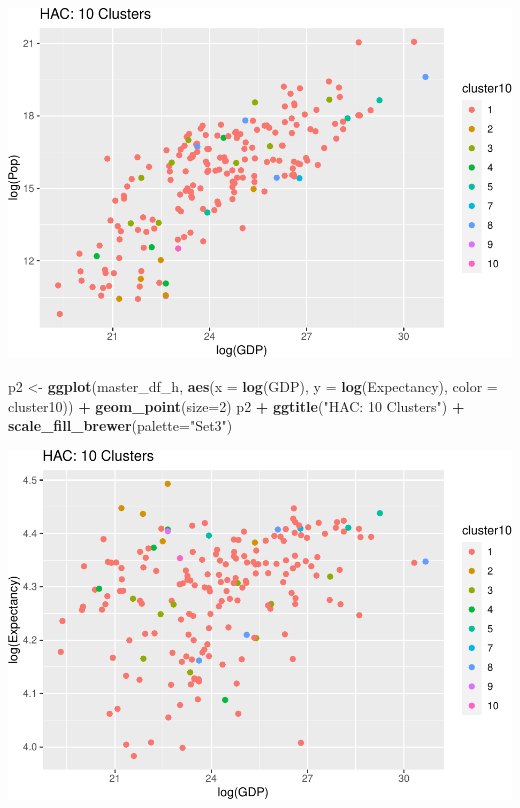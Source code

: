 \documentclass[]{article}
\newenvironment{Shaded}{\begin{snugshade}}{\end{snugshade}}
\newcommand{\DataTypeTok}[1]{\textcolor[rgb]{0.13,0.29,0.53}{#1}}
\newcommand{\DecValTok}[1]{\textcolor[rgb]{0.00,0.00,0.81}{#1}}
\newcommand{\KeywordTok}[1]{\textcolor[rgb]{0.13,0.29,0.53}{\textbf{#1}}}
\newcommand{\NormalTok}[1]{#1}
\newcommand{\OperatorTok}[1]{\textcolor[rgb]{0.81,0.36,0.00}{\textbf{#1}}}
\newcommand{\StringTok}[1]{\textcolor[rgb]{0.31,0.60,0.02}{#1}}
\begin{document}
\includegraphics{eda_files/figure-latex/unnamed-chunk-30-1.pdf}

\begin{Shaded}
\begin{Highlighting}[]
\NormalTok{p2 <-}\StringTok{ }\KeywordTok{ggplot}\NormalTok{(master_df_h, }\KeywordTok{aes}\NormalTok{(}\DataTypeTok{x =} \KeywordTok{log}\NormalTok{(GDP), }\DataTypeTok{y =} \KeywordTok{log}\NormalTok{(Expectancy), }\DataTypeTok{color =}\NormalTok{ cluster10)) }\OperatorTok{+}
\StringTok{  }\KeywordTok{geom_point}\NormalTok{(}\DataTypeTok{size=}\DecValTok{2}\NormalTok{)}
\NormalTok{p2 }\OperatorTok{+}\StringTok{ }\KeywordTok{ggtitle}\NormalTok{(}\StringTok{"HAC: 10 Clusters"}\NormalTok{) }\OperatorTok{+}\StringTok{ }\KeywordTok{scale_fill_brewer}\NormalTok{(}\DataTypeTok{palette=}\StringTok{"Set3"}\NormalTok{)}
\end{Highlighting}
\end{Shaded}

\includegraphics{eda_files/figure-latex/unnamed-chunk-30-2.pdf}
\end{document}
